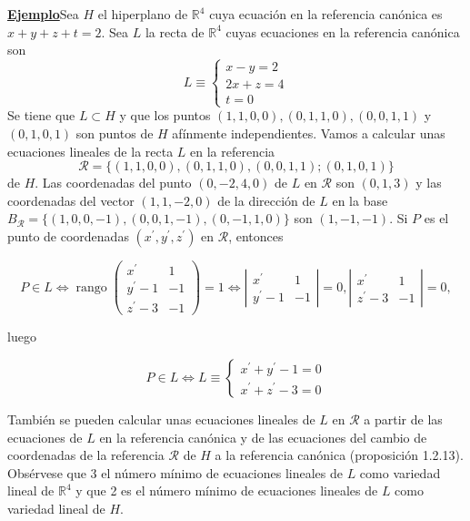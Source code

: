 \documentclass[12pt, a4paper, ones, notitlepage, openany,titlepage]{article}
\newcommand{\ejemplo}{\noindent\underline{\textbf{Ejemplo}}}
\begin{document}
\ejemplo Sea $H$ el hiperplano de $\mathbb{R}^{4}$ cuya ecuación en la referencia canónica es $x+y+z+t=2$. Sea $L$ la recta de $\mathbb{R}^{4}$ cuyas ecuaciones en la referencia canónica son
$$
L \equiv\left\{\begin{array}{l}
x-y=2 \\
2 x+z=4 \\
t=0
\end{array}\right.
$$
Se tiene que $L \subset H$ y que los puntos $(1,1,0,0),(0,1,1,0),(0,0,1,1)$ y $(0,1,0,1)$ son puntos de $H$ afínmente independientes. Vamos a calcular unas ecuaciones lineales de la recta $L$ en la referencia
$$
\mathcal{R}=\{(1,1,0,0),(0,1,1,0),(0,0,1,1) ;(0,1,0,1)\}
$$
de $H$. Las coordenadas del punto $(0,-2,4,0)$ de $L$ en $\mathcal{R}$ son $(0,1,3)$ y las coordenadas del vector $(1,1,-2,0)$ de la dirección de $L$ en la base $B_{\mathcal{R}}=\{(1,0,0,-1),(0,0,1,-1),(0,-1,1,0)\}$ son $(1,-1,-1)$. Si $P$ es el punto de coordenadas $\left(x^{\prime}, y^{\prime}, z^{\prime}\right)$ en $\mathcal{R}$, entonces

$$
P \in L \Longleftrightarrow \operatorname{rango}\left(\begin{array}{cc}
x^{\prime} & 1 \\
y^{\prime}-1 & -1 \\
z^{\prime}-3 & -1
\end{array}\right)=1 \Longleftrightarrow\left|\begin{array}{cr}
x^{\prime} & 1 \\
y^{\prime}-1 & -1
\end{array}\right|=0,\left|\begin{array}{cr}
x^{\prime} & 1 \\
z^{\prime}-3 & -1
\end{array}\right|=0,
$$

luego

$$
P \in L \Longleftrightarrow L \equiv\left\{\begin{array}{l}
x^{\prime}+y^{\prime}-1=0 \\
x^{\prime}+z^{\prime}-3=0
\end{array}\right.
$$

También se pueden calcular unas ecuaciones lineales de $L$ en $\mathcal{R}$ a partir de las ecuaciones de $L$ en la referencia canónica y de las ecuaciones del cambio de coordenadas de la referencia $\mathcal{R}$ de $H$ a la referencia canónica (proposición 1.2.13). Obsérvese que 3 el número mínimo de ecuaciones lineales de $L$ como variedad lineal de $\mathbb{R}^{4}$ y que 2 es el número mínimo de ecuaciones lineales de $L$ como variedad lineal de $H$.
\end{document}
